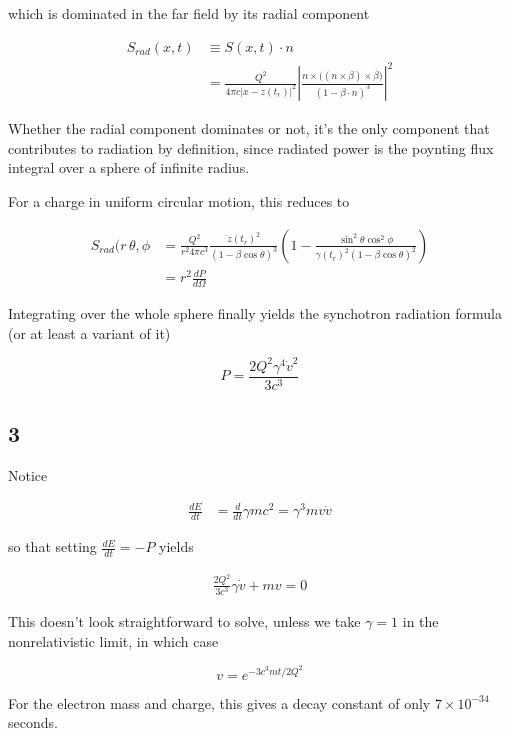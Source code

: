 \documentclass[12pt]{article}
\begin{document}
which is dominated in the far field by its radial component

\begin{align*}
S_{rad}(x,t) &\equiv S(x,t) \cdot n \\
&= \frac{Q^2}{4\pi c|x-z(t_r)|^2}\left| \frac{n \times ((n \times \beta) \times \dot{\beta)}}{(1-\beta \cdot n)^3} \right|^2
\end{align*}

Whether the radial component dominates or not, it's the only component that contributes to radiation by definition, since radiated power is the poynting flux integral over a sphere of infinite radius.

For a charge in uniform circular motion, this reduces to

\begin{align*}
S_{rad}(r\,\theta,\phi &= \frac{Q^2}{r^2 4\pi c^3}\frac{\dot{z}(t_r)^2}{(1-\beta \cos\theta)^3}\left( 1- \frac{\sin^2\theta\cos^2\phi}{\gamma(t_r)^2(1-\beta\cos\theta)^2}\right) \\[6pt]
&= r^2\frac{dP}{d\Omega}
\end{align*}

Integrating over the whole sphere finally yields the synchotron radiation formula (or at least a variant of it)

\[ P = \frac{2Q^2\gamma^4\dot{v}^2}{3c^3}
\]

\subsection*{3}

Notice

\begin{align*}
\frac{dE}{dt} &= \frac{d}{dt}\gamma m c^2 = \gamma^3mv\dot{v}
\end{align*}

so that setting \(\frac{dE}{dt} = -P\) yields

\begin{align*}
\frac{2Q^2}{3c^3}\gamma\dot{v}+ mv = 0
\end{align*}

This doesn't look straightforward to solve, unless we take \(\gamma = 1\) in the nonrelativistic limit, in which case

\[v = e^{-3c^3mt/2Q^2}
\]

For the electron mass and charge, this gives a decay constant of only \(7 \times 10^{-34}\) seconds. 
\end{document}
